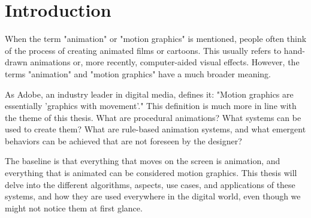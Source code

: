 \section{Introduction}
\label{sec:intro}

When the term "animation" or "motion graphics" is mentioned, people often think of the process of creating animated films or cartoons. This usually refers to hand-drawn animations or, more recently, computer-aided visual effects. However, the terms "animation" and "motion graphics" have a much broader meaning.

As Adobe, an industry leader in digital media, defines it: "Motion graphics are essentially 'graphics with movement'." \cite{adobe-motion-graphics} This definition is much more in line with the theme of this thesis. What are procedural animations? What systems can be used to create them? What are rule-based animation systems, and what emergent behaviors can be achieved that are not foreseen by the designer? 

The baseline is that everything that moves on the screen is animation, and everything that is animated can be considered motion graphics. This thesis will delve into the different algorithms, aspects, use cases, and applications of these systems, and how they are used everywhere in the digital world, even though we might not notice them at first glance.
